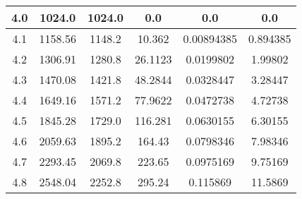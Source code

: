 \begin{table}[h!]
\begin{tabular}{|c|c|c|c|c|c|}
        4.0        & 1024.0         & 1024.0                       & 0.0          & 0.0               & 0.0               \\ \hline
        4.1        & 1158.56        & 1148.2                       & 10.362       & 0.00894385        & 0.894385          \\ \hline
        4.2        & 1306.91        & 1280.8                       & 26.1123      & 0.0199802         & 1.99802           \\ \hline
        4.3        & 1470.08        & 1421.8                       & 48.2844      & 0.0328447         & 3.28447           \\ \hline
        4.4        & 1649.16        & 1571.2                       & 77.9622      & 0.0472738         & 4.72738           \\ \hline
        4.5        & 1845.28        & 1729.0                       & 116.281      & 0.0630155         & 6.30155           \\ \hline
        4.6        & 2059.63        & 1895.2                       & 164.43       & 0.0798346         & 7.98346           \\ \hline
        4.7        & 2293.45        & 2069.8                       & 223.65       & 0.0975169         & 9.75169           \\ \hline
        4.8        & 2548.04        & 2252.8                       & 295.24       & 0.115869          & 11.5869           \\ \hline
    \end{tabular}\label{tab:table5}
\end{table}
